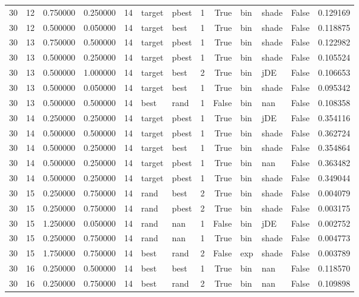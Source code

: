 \begin{tabular}{rrrrrllrrllrr}
30 & 12 & 0.750000 & 0.250000 & 14 & target & pbest & 1 & True & bin & shade & False & 0.129169 \\
30 & 12 & 0.500000 & 0.050000 & 14 & target & best & 1 & True & bin & shade & False & 0.118875 \\
30 & 13 & 0.750000 & 0.500000 & 14 & target & pbest & 1 & True & bin & shade & False & 0.122982 \\
30 & 13 & 0.500000 & 0.250000 & 14 & target & pbest & 1 & True & bin & shade & False & 0.105524 \\
30 & 13 & 0.500000 & 1.000000 & 14 & target & best & 2 & True & bin & jDE & False & 0.106653 \\
30 & 13 & 0.500000 & 0.050000 & 14 & target & best & 1 & True & bin & shade & False & 0.095342 \\
30 & 13 & 0.500000 & 0.500000 & 14 & best & rand & 1 & False & bin & nan & False & 0.108358 \\
30 & 14 & 0.250000 & 0.250000 & 14 & target & pbest & 1 & True & bin & jDE & False & 0.354116 \\
30 & 14 & 0.500000 & 0.500000 & 14 & target & pbest & 1 & True & bin & shade & False & 0.362724 \\
30 & 14 & 0.500000 & 0.250000 & 14 & target & best & 1 & True & bin & shade & False & 0.354864 \\
30 & 14 & 0.500000 & 0.250000 & 14 & target & pbest & 1 & True & bin & nan & False & 0.363482 \\
30 & 14 & 0.500000 & 0.250000 & 14 & target & pbest & 1 & True & bin & shade & False & 0.349044 \\
30 & 15 & 0.250000 & 0.750000 & 14 & rand & best & 2 & True & bin & shade & False & 0.004079 \\
30 & 15 & 0.250000 & 0.750000 & 14 & rand & pbest & 2 & True & bin & shade & False & 0.003175 \\
30 & 15 & 1.250000 & 0.050000 & 14 & rand & nan & 1 & False & bin & jDE & False & 0.002752 \\
30 & 15 & 0.250000 & 0.750000 & 14 & rand & nan & 1 & True & bin & shade & False & 0.004773 \\
30 & 15 & 1.750000 & 0.750000 & 14 & best & rand & 2 & False & exp & shade & False & 0.003789 \\
30 & 16 & 0.250000 & 0.500000 & 14 & best & best & 1 & True & bin & nan & False & 0.118570 \\
30 & 16 & 0.250000 & 0.750000 & 14 & best & rand & 2 & True & bin & nan & False & 0.109898 \\

\end{tabular}
